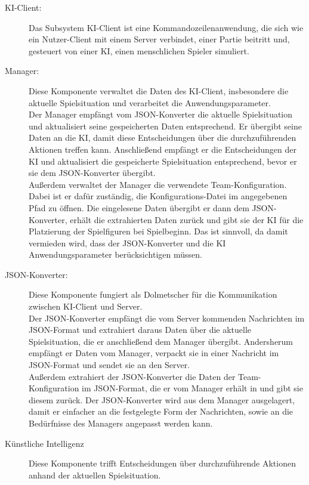 \begin{description}
	\item[KI-Client:] 
	Das Subsystem KI-Client ist eine Kommandozeilenanwendung, die sich wie ein Nutzer-Client mit einem Server verbindet, einer Partie beitritt und, gesteuert von einer KI, einen menschlichen Spieler simuliert. 
	\\
	\item[Manager:]
	Diese Komponente verwaltet die Daten des KI-Client, insbesondere die aktuelle Spielsituation und verarbeitet die Anwendungsparameter.\\ Der Manager empfängt vom JSON-Konverter die aktuelle Spielsituation und aktualisiert seine gespeicherten Daten entsprechend. Er übergibt seine Daten an die KI, damit diese Entscheidungen über die durchzuführenden Aktionen treffen kann. Anschließend empfängt er die Entscheidungen der KI und aktualisiert die gespeicherte Spielsituation entsprechend, bevor er sie dem JSON-Konverter übergibt.\\
	Außerdem verwaltet der Manager die verwendete Team-Konfiguration. Dabei ist er dafür zuständig, die Konfigurations-Datei im angegebenen Pfad zu öffnen. Die eingelesene Daten übergibt er dann dem JSON-Konverter, erhält die extrahierten Daten zurück und gibt sie der KI für die Platzierung der Spielfiguren bei Spielbeginn. Das ist sinnvoll, da damit vermieden wird, dass der JSON-Konverter und die KI Anwendungsparameter berücksichtigen müssen.
	\\
	\item[JSON-Konverter:]
	Diese Komponente fungiert als Dolmetscher für die Kommunikation zwischen KI-Client und Server.\\
	Der JSON-Konverter empfängt die vom Server kommenden Nachrichten im JSON-Format und extrahiert daraus Daten über die aktuelle Spielsituation, die er anschließend dem Manager übergibt. Andersherum empfängt er Daten vom Manager, verpackt sie in einer Nachricht im JSON-Format und sendet sie an den Server.\\
	Außerdem extrahiert der JSON-Konverter die Daten der Team-Konfiguration im JSON-Format, die er vom Manager erhält in und gibt sie diesem zurück.
	Der JSON-Konverter wird aus dem Manager ausgelagert, damit er einfacher an die festgelegte Form der Nachrichten, sowie an die Bedürfnisse des Managers angepasst werden kann.
	\\
	\item[Künstliche Intelligenz] 
	Diese Komponente trifft Entscheidungen über durchzuführende Aktionen anhand der aktuellen Spielsituation.\\

\end{description}
